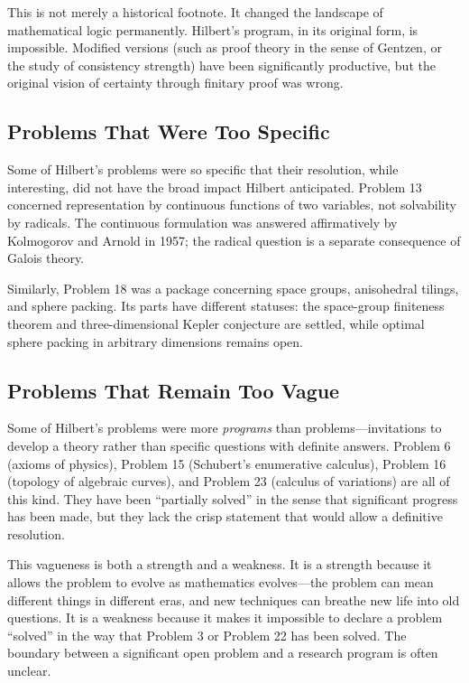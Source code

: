 This is not merely a historical footnote. It changed the landscape of mathematical logic permanently. Hilbert's program, in its original form, is impossible. Modified versions (such as proof theory in the sense of Gentzen, or the study of consistency strength) have been significantly productive, but the original vision of certainty through finitary proof was wrong.

\subsection{Problems That Were Too Specific}

Some of Hilbert's problems were so specific that their resolution, while interesting, did not have the broad impact Hilbert anticipated. Problem 13 concerned representation by continuous functions of two variables, not solvability by radicals. The continuous formulation was answered affirmatively by Kolmogorov and Arnold in 1957; the radical question is a separate consequence of Galois theory.

Similarly, Problem 18 was a package concerning space groups, anisohedral tilings, and sphere packing. Its parts have different statuses: the space-group finiteness theorem and three-dimensional Kepler conjecture are settled, while optimal sphere packing in arbitrary dimensions remains open.

\subsection{Problems That Remain Too Vague}

Some of Hilbert's problems were more \emph{programs} than problems---invitations to develop a theory rather than specific questions with definite answers. Problem 6 (axioms of physics), Problem 15 (Schubert's enumerative calculus), Problem 16 (topology of algebraic curves), and Problem 23 (calculus of variations) are all of this kind. They have been ``partially solved'' in the sense that significant progress has been made, but they lack the crisp statement that would allow a definitive resolution.

This vagueness is both a strength and a weakness. It is a strength because it allows the problem to evolve as mathematics evolves---the problem can mean different things in different eras, and new techniques can breathe new life into old questions. It is a weakness because it makes it impossible to declare a problem ``solved'' in the way that Problem 3 or Problem 22 has been solved. The boundary between a significant open problem and a research program is often unclear.

